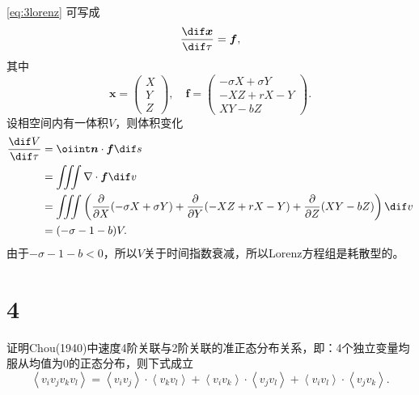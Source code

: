 \documentclass[12pt]{ctexart}
\begin{document}
\cref{eq:3lorenz} 可写成
\begin{equation}
	\frac{\dif \bm{x}}{\dif \tau} = \bm{f},
\end{equation}
其中
\begin{equation}
	\bm{x} = \begin{pmatrix}
		X \\Y\\Z
	\end{pmatrix},\quad
	\bm{f} = \begin{pmatrix}
		-\sigma X+\sigma Y \\-X Z+r X-Y\\X Y-b Z
	\end{pmatrix}.
\end{equation}
设相空间内有一体积$V$，则体积变化
\begin{equation}
	\begin{aligned}
		\frac{\dif V}{\dif \tau} & = \oiint \bm{n} \cdot \bm{f} \dif s                                                                                                                                   \\
		                         & = \iiint \nabla  \cdot \bm{f} \dif v                                                                                                                                  \\
		                         & = \iiint \left(\frac{\partial }{\partial X} (-\sigma X+\sigma Y  ) + \frac{\partial }{\partial Y} (-X Z+r X-Y) + \frac{\partial }{\partial Z} (X Y-b Z )\right)\dif v \\
		                         & = (-\sigma - 1 - b) V.
	\end{aligned}
\end{equation}
由于$-\sigma - 1 - b<0$，所以$V$关于时间指数衰减，所以Lorenz方程组是耗散型的。


\section{4}

证明Chou(1940)中速度4阶关联与2阶关联的准正态分布关系，即：4个独立变量均服从均值为0的正态分布，则下式成立
\begin{equation}
	\left\langle v_{i} v_{j} v_{k} v_{l}\right\rangle=\left\langle v_{i} v_{j}\right\rangle \cdot\left\langle v_{k} v_{l}\right\rangle+\left\langle v_{i} v_{k}\right\rangle \cdot\left\langle v_{j} v_{l}\right\rangle+\left\langle v_{i} v_{l}\right\rangle \cdot\left\langle v_{j} v_{k}\right\rangle.
\end{equation}
\end{document}
